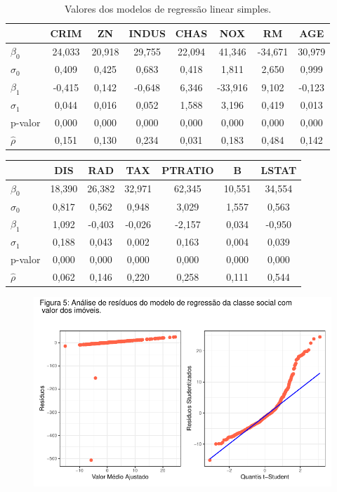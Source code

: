 \documentclass[
  letterpaper,
]{report}
\begin{document}
\begin{table}[H]

\caption{Valores dos modelos de regressão linear simples.}
\centering
\begin{tabular}[t]{l|c|c|c|c|c|c|c}
\hline
  & CRIM & ZN & INDUS & CHAS & NOX & RM & AGE\\
\hline
$\beta_0$ & 24,033 & 20,918 & 29,755 & 22,094 & 41,346 & -34,671 & 30,979\\
\hline
$\sigma_0$ & 0,409 & 0,425 & 0,683 & 0,418 & 1,811 & 2,650 & 0,999\\
\hline
$\beta_1$ & -0,415 & 0,142 & -0,648 & 6,346 & -33,916 & 9,102 & -0,123\\
\hline
$\sigma_1$ & 0,044 & 0,016 & 0,052 & 1,588 & 3,196 & 0,419 & 0,013\\
\hline
p-valor & 0,000 & 0,000 & 0,000 & 0,000 & 0,000 & 0,000 & 0,000\\
\hline
$\hat \rho$ & 0,151 & 0,130 & 0,234 & 0,031 & 0,183 & 0,484 & 0,142\\
\hline
\end{tabular}
\end{table}

\begin{table}[H]
\centering
\begin{tabular}[t]{l|c|c|c|c|c|c}
\hline
  & DIS & RAD & TAX & PTRATIO & B & LSTAT\\
\hline
$\beta_0$ & 18,390 & 26,382 & 32,971 & 62,345 & 10,551 & 34,554\\
\hline
$\sigma_0$ & 0,817 & 0,562 & 0,948 & 3,029 & 1,557 & 0,563\\
\hline
$\beta_1$ & 1,092 & -0,403 & -0,026 & -2,157 & 0,034 & -0,950\\
\hline
$\sigma_1$ & 0,188 & 0,043 & 0,002 & 0,163 & 0,004 & 0,039\\
\hline
p-valor & 0,000 & 0,000 & 0,000 & 0,000 & 0,000 & 0,000\\
\hline
$\hat \rho$ & 0,062 & 0,146 & 0,220 & 0,258 & 0,111 & 0,544\\
\hline
\end{tabular}
\end{table}

\begin{figure}[H]

{\centering \includegraphics{Parte-1_files/figure-pdf/unnamed-chunk-7-1.pdf}

}

\end{figure}
\end{document}
